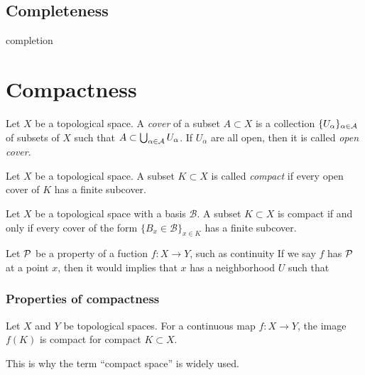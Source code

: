 \documentclass{../crs}
\begin{document}
\section{Completeness}
completion















\chapter{Compactness}


\begin{defn}
Let $X$ be a topological space.
A \emph{cover} of a subset $A\subset X$ is a collection $\{U_\alpha\}_{\alpha\in\mathcal{A}}$ of subsets of $X$ such that $A\subset\bigcup_{\alpha\in\mathcal{A}}U_\alpha$.
If $U_\alpha$ are all open, then it is called \emph{open cover}.
\end{defn}
\begin{defn}
Let $X$ be a topological space.
A subset $K\subset X$ is called \emph{compact} if every open cover of $K$ has a finite subcover.
\end{defn}
\begin{prop}
Let $X$ be a topological space with a basis $\mathcal{B}$.
A subset $K\subset X$ is compact if and only if every cover of the form $\{B_x\in\mathcal{B}\}_{x\in K}$ has a finite subcover.
\end{prop}
\begin{rmk}
Let $\mathcal{P}$ be a property of a fuction $f\colon X\to Y$, such as continuity
If we say $f$ has $\mathcal{P}$ at a point $x$, then it would implies that $x$ has a neighborhood $U$ such that 
\end{rmk}

\subsection{Properties of compactness}
\begin{thm}
Let $X$ and $Y$ be topological spaces.
For a continuous map $f\colon X\to Y$, the image $f(K)$ is compact for compact $K\subset X$.
\end{thm}

\begin{rmk}
This is why the term ``compact space'' is widely used.
\end{rmk}
\end{document}
